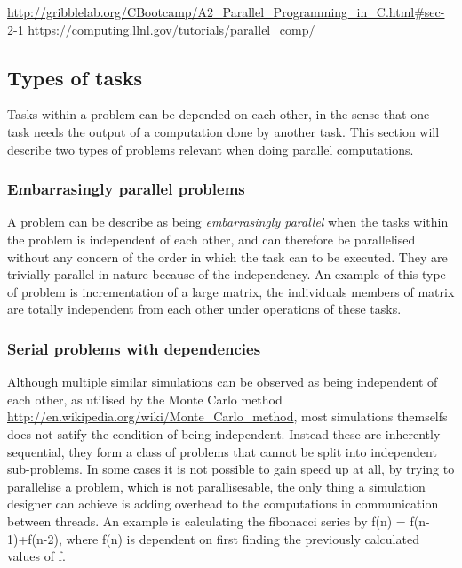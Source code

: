 \url{http://gribblelab.org/CBootcamp/A2_Parallel_Programming_in_C.html#sec-2-1}
\url{https://computing.llnl.gov/tutorials/parallel_comp/}

\subsection{Types of tasks}
\label{top}

Tasks within a problem can be depended on each other, in the sense that one task needs the output of a computation done by another task. This section will describe two types of problems relevant when doing parallel computations.

\subsubsection{Embarrasingly parallel problems}
  A problem can be describe as being \emph{embarrasingly parallel} when the tasks within the problem is independent of each other, and can therefore be parallelised without any concern of the order in which the task can to be executed. They are trivially parallel in nature because of the independency.
  An example of this type of problem is incrementation of a large matrix, the individuals members of matrix are totally independent from each other under operations of these tasks.

\subsubsection{Serial problems with dependencies}
  Although multiple similar simulations can be observed as being independent of each other, as utilised by the Monte Carlo method \url{http://en.wikipedia.org/wiki/Monte_Carlo_method}, most simulations themselfs does not satify the condition of being independent. Instead these are inherently sequential, they form a class of problems that cannot be split into independent sub-problems. In some cases it is not possible to gain speed up at all, by trying to parallelise a problem, which is not parallisesable, the only thing a simulation designer can achieve is adding overhead to the computations in communication between threads.
  An example is calculating the fibonacci series by f(n) = f(n-1)+f(n-2), where f(n) is dependent on first finding the previously calculated values of f.
